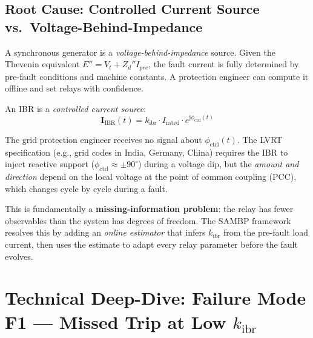 \documentclass[12pt,a4paper]{article}
\newcommand{\kibr}{k_\mathrm{ibr}}
\newcommand{\Irated}{I_\mathrm{rated}}
\newcommand{\phictrl}{\phi_\mathrm{ctrl}}
\newcommand{\jj}{\mathrm{j}}
\begin{document}
\subsection{Root Cause: Controlled Current Source vs.\ Voltage-Behind-Impedance}

A synchronous generator is a \emph{voltage-behind-impedance} source.  Given the
Thevenin equivalent $E'' = V_t + Z_d'' I_{pre}$, the fault current is fully determined
by pre-fault conditions and machine constants.  A protection engineer can compute it
offline and set relays with confidence.

An IBR is a \emph{controlled current source}:
\begin{equation}
  \bm{I}_\mathrm{IBR}(t) = \kibr \cdot \Irated \cdot e^{\jj\phictrl(t)}
  \label{eq:ibr_model}
\end{equation}

\noindent The grid protection engineer receives no signal about $\phictrl(t)$.  The
LVRT specification (e.g., grid codes in India, Germany, China) requires the IBR to
inject reactive support ($\phictrl \approx \pm 90^\circ$) during a voltage dip, but
the \emph{amount and direction} depend on the local voltage at the point of common
coupling (PCC), which changes cycle by cycle during a fault.

\medskip
\noindent This is fundamentally a \textbf{missing-information problem}: the relay has
fewer observables than the system has degrees of freedom.  The SAMBP framework resolves
this by adding an \emph{online estimator} that infers $\kibr$ from the pre-fault load
current, then uses the estimate to adapt every relay parameter before the fault
evolves.

\section{Technical Deep-Dive: Failure Mode F1 --- Missed Trip at Low $\kibr$}
\end{document}
